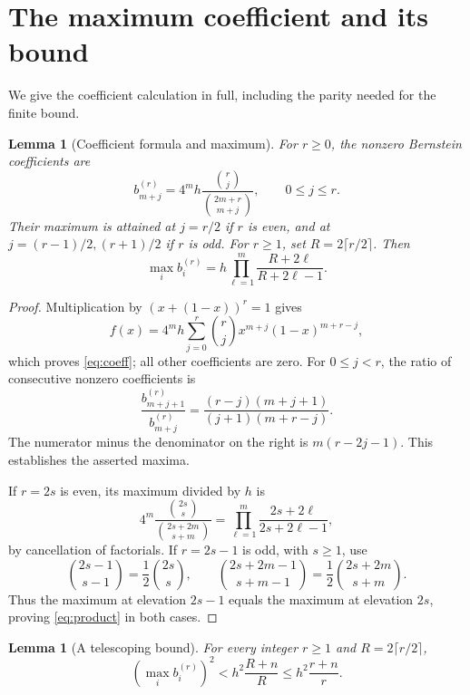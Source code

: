 \documentclass[11pt]{article}
\newtheorem{lemma}[theorem]{Lemma}
\begin{document}
\section{The maximum coefficient and its bound}
We give the coefficient calculation in full, including the parity
needed for the finite bound.

\begin{lemma}[Coefficient formula and maximum]\label{lem:coeff}
For $r\ge0$, the nonzero Bernstein coefficients are
\begin{equation}\label{eq:coeff}
b_{m+j}^{(r)}=4^m h\frac{\binom rj}{\binom{2m+r}{m+j}},
\qquad 0\le j\le r.
\end{equation}
Their maximum is attained at $j=r/2$ if $r$ is even, and at
$j=(r-1)/2,(r+1)/2$ if $r$ is odd. For $r\ge1$, set
$R=2\lceil r/2\rceil$. Then
\begin{equation}\label{eq:product}
\max_i b_i^{(r)}
=h\prod_{\ell=1}^{m}\frac{R+2\ell}{R+2\ell-1}.
\end{equation}
\end{lemma}

\begin{proof}
Multiplication by $(x+(1-x))^r=1$ gives
\[
f(x)=4^m h\sum_{j=0}^r\binom rj x^{m+j}(1-x)^{m+r-j},
\]
which proves \eqref{eq:coeff}; all other coefficients are zero.
For $0\le j<r$, the ratio of consecutive nonzero coefficients is
\[
\frac{b_{m+j+1}^{(r)}}{b_{m+j}^{(r)}}
=\frac{(r-j)(m+j+1)}{(j+1)(m+r-j)}.
\]
The numerator minus the denominator on the right is $m(r-2j-1)$.
This establishes the asserted maxima.

If $r=2s$ is even, its maximum divided by $h$ is
\[
4^m\frac{\binom{2s}{s}}{\binom{2s+2m}{s+m}}
=\prod_{\ell=1}^m\frac{2s+2\ell}{2s+2\ell-1},
\]
by cancellation of factorials. If $r=2s-1$ is odd, with $s\ge1$,
use
\[
\binom{2s-1}{s-1}=\frac12\binom{2s}{s},\qquad
\binom{2s+2m-1}{s+m-1}=\frac12\binom{2s+2m}{s+m}.
\]
Thus the maximum at elevation $2s-1$ equals the maximum at elevation
$2s$, proving \eqref{eq:product} in both cases.
\end{proof}

\begin{lemma}[A telescoping bound]\label{lem:bound}
For every integer $r\ge1$ and $R=2\lceil r/2\rceil$,
\begin{equation}\label{eq:bound}
\left(\max_i b_i^{(r)}\right)^2
<h^2\frac{R+n}{R}\le h^2\frac{r+n}{r}.
\end{equation}
\end{lemma}
\end{document}
